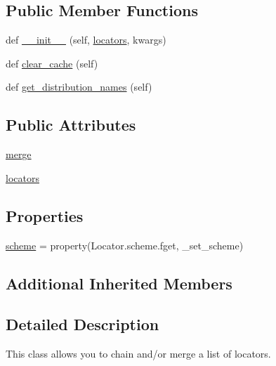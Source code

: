 \subsection*{Public Member Functions}
\begin{DoxyCompactItemize}
\item 
def \hyperlink{classpip_1_1__vendor_1_1distlib_1_1locators_1_1AggregatingLocator_af826191209a23190440e116c42c46511}{\+\_\+\+\_\+init\+\_\+\+\_\+} (self, \hyperlink{classpip_1_1__vendor_1_1distlib_1_1locators_1_1AggregatingLocator_a9869012125339537c92f63813b577a27}{locators}, kwargs)
\item 
def \hyperlink{classpip_1_1__vendor_1_1distlib_1_1locators_1_1AggregatingLocator_a937d4d11aa45376977d68da1656ae82a}{clear\+\_\+cache} (self)
\item 
def \hyperlink{classpip_1_1__vendor_1_1distlib_1_1locators_1_1AggregatingLocator_abdaa0caa07f2874b2b48536d1a4af19a}{get\+\_\+distribution\+\_\+names} (self)
\end{DoxyCompactItemize}
\subsection*{Public Attributes}
\begin{DoxyCompactItemize}
\item 
\hyperlink{classpip_1_1__vendor_1_1distlib_1_1locators_1_1AggregatingLocator_ae3e06402656d79dfb3ca18a4952b0a35}{merge}
\item 
\hyperlink{classpip_1_1__vendor_1_1distlib_1_1locators_1_1AggregatingLocator_a9869012125339537c92f63813b577a27}{locators}
\end{DoxyCompactItemize}
\subsection*{Properties}
\begin{DoxyCompactItemize}
\item 
\hyperlink{classpip_1_1__vendor_1_1distlib_1_1locators_1_1AggregatingLocator_af0c471c0f3403873f5d41240f3fbc34a}{scheme} = property(Locator.\+scheme.\+fget, \+\_\+set\+\_\+scheme)
\end{DoxyCompactItemize}
\subsection*{Additional Inherited Members}


\subsection{Detailed Description}
\begin{DoxyVerb}This class allows you to chain and/or merge a list of locators.
\end{DoxyVerb}
 

